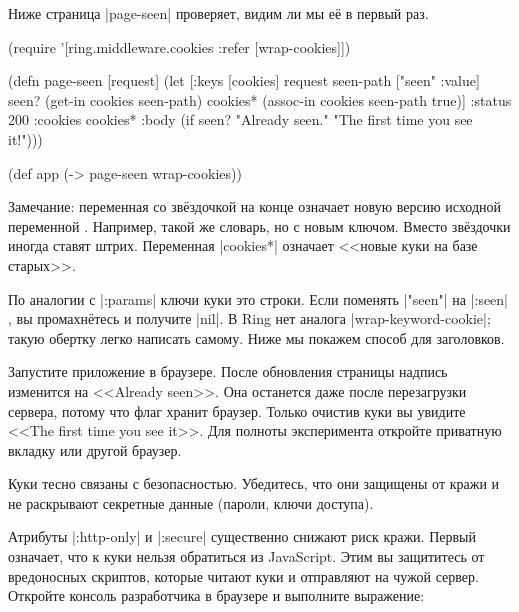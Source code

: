 Ниже страница \spverb|page-seen| проверяет, видим ли мы е\"{е} в первый раз.


\begin{english}
  \begin{clojure/lines}
(require '[ring.middleware.cookies
           :refer [wrap-cookies]])

(defn page-seen [request]
  (let [{:keys [cookies]} request
        seen-path ["seen" :value]
        seen? (get-in cookies seen-path)
        cookies* (assoc-in cookies seen-path true)]
    {:status 200
     :cookies cookies*
     :body (if seen?
             "Already seen."
             "The first time you see it!")}))

(def app (-> page-seen
             wrap-cookies))
  \end{clojure/lines}
\end{english}

Замечание: переменная со зв\"{е}здочкой на конце означает новую версию исходной
переменной . Например, такой же словарь, но с новым ключом. Вместо
зв\"{е}здочки иногда ставят штрих. Переменная \spverb|cookies*| означает <<новые
куки на базе старых>>.


По аналогии с \spverb|:params| ключи куки это строки. Если поменять
\spverb|"seen"| на \spverb|:seen| , вы промахн\"{е}тесь и получите
\spverb|nil|. В Ring нет аналога \spverb|wrap-keyword-cookie|; такую обертку
легко написать самому. Ниже мы покажем способ для заголовков.

Запустите приложение в браузере. После обновления страницы надпись изменится на
<<Already seen>>. Она останется даже после перезагрузки сервера, потому что флаг
хранит браузер. Только очистив куки вы увидите <<The first time you see
it>>. Для полноты эксперимента откройте приватную вкладку или другой браузер.


Куки тесно связаны с безопасностью. Убедитесь, что они защищены от кражи и не
раскрывают секретные данные (пароли, ключи доступа).

Атрибуты \spverb|:http-only| и \spverb|:secure| существенно снижают риск
кражи. Первый означает, что к куки нельзя обратиться из JavaScript. Этим вы
защититесь от вредоносных скриптов, которые читают куки и отправляют на чужой
сервер. Откройте консоль разработчика в браузере и выполните выражение:

